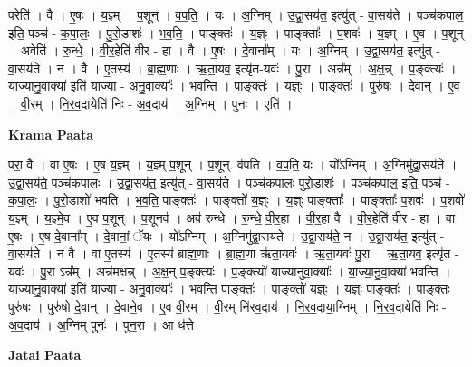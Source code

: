\documentclass[17pt]{extarticle}
\begin{document}
परेति॑ । वै । ए॒षः । य॒ज्ञ्म् । प॒शून् । व॒प॒ति॒ । यः । अ॒ग्निम् । उ॒द्वा॒सय॑त॒ इत्यु॑त् - वा॒सय॑ते । पञ्च॑कपाल॒ इति॒ पञ्च॑ - क॒पा॒लः॒ । पु॒रो॒डाशः॑ । भ॒व॒ति॒ । पाङ्क्तः॑ । य॒ज्ञ्ः । पाङ्क्ताः᳚ । प॒शवः॑ । य॒ज्ञ्म् । ए॒व । प॒शून् । अवेति॑ । रु॒न्धे॒ । वी॒र॒हेति॑ वीर - हा । वै । ए॒षः । दे॒वाना᳚म् । यः । अ॒ग्निम् । उ॒द्वा॒सय॑त॒ इत्यु॑त् - वा॒सय॑ते । न । वै । ए॒तस्य॑ । ब्रा॒ह्म॒णाः । ऋ॒ता॒यव॒ इत्यृ॑त-यवः॑ । पु॒रा । अन्न᳚म् । अ॒क्ष॒न्न् । प॒ङ्क्त्यः॑ । या॒ज्या॒नु॒वा॒क्या॑ इति॑ याज्या - अ॒नु॒वा॒क्याः᳚ । भ॒व॒न्ति॒ । पाङ्क्तः॑ । य॒ज्ञ्ः । पाङ्क्तः॑ । पुरु॑षः । दे॒वान् । ए॒व । वी॒रम् । नि॒र॒व॒दायेति॑ निः - अ॒व॒दाय॑ । अ॒ग्निम् । पुनः॑ । एति॑ ।  \newline


\textbf{Krama Paata} \newline

परा॒ वै । वा ए॒षः । ए॒ष य॒ज्ञ्म् । य॒ज्ञ्म् प॒शून् । प॒शून्. व॑पति । व॒प॒ति॒ यः । यो᳚ऽग्निम् । अ॒ग्निमु॑द्वा॒सय॑ते । उ॒द्वा॒सय॑ते॒ पञ्च॑कपालः । उ॒द्वा॒सय॑त॒ इत्यु॑त् - वा॒सय॑ते । पञ्च॑कपालः पुरो॒डाशः॑ । पञ्च॑कपाल॒ इति॒ पञ्च॑ - क॒पा॒लः॒ । पु॒रो॒डाशो॑ भवति । भ॒व॒ति॒ पाङ्क्तः॑ । पाङ्क्तो॑ य॒ज्ञ्ः । य॒ज्ञ्ः पाङ्क्ताः᳚ । पाङ्क्ताः᳚ प॒शवः॑ । प॒शवो॑ य॒ज्ञ्म् । य॒ज्ञ्मे॒व । ए॒व प॒शून् । प॒शूनव॑ । अव॑ रुन्धे । रु॒न्धे॒ वी॒र॒हा । वी॒र॒हा वै । वी॒र॒हेति॑ वीर - हा । वा ए॒षः । ए॒ष दे॒वाना᳚म् । दे॒वानां॒ ॅयः । यो᳚ऽग्निम् । अ॒ग्निमु॑द्वा॒सय॑ते । उ॒द्वा॒सय॑ते॒ न । उ॒द्वा॒सय॑त॒ इत्यु॑त् - वा॒सय॑ते । न वै । वा ए॒तस्य॑ । ए॒तस्य॑ ब्राह्म॒णाः । ब्रा॒ह्म॒णा ऋ॑ता॒यवः॑ । ऋ॒ता॒यवः॑ पु॒रा । ऋ॒ता॒यव॒ इत्यृ॑त - यवः॑ । पु॒रा ऽन्न᳚म् । अन्न॑मक्षन्न् । अ॒क्ष॒न् प॒ङ्क्त्यः॑ । प॒ङ्क्त्यो॑ याज्यानुवा॒क्याः᳚ । या॒ज्या॒नु॒वा॒क्या॑ भवन्ति । या॒ज्या॒नु॒वा॒क्या॑ इति॑ याज्या - अ॒नु॒वा॒क्याः᳚ । भ॒व॒न्ति॒ पाङ्क्तः॑ । पाङ्क्तो॑ य॒ज्ञ्ः । य॒ज्ञ्ः पाङ्क्तः॑ । पाङ्क्तः॒ पुरु॑षः । पुरु॑षो दे॒वान् । दे॒वाने॒व । ए॒व वी॒रम् । वी॒रम् नि॑रव॒दाय॑ । नि॒र॒व॒दाया॒ग्निम् । नि॒र॒व॒दायेति॑ निः - अ॒व॒दाय॑ । अ॒ग्निम् पुनः॑ । पुन॒रा । आ ध॑त्ते \newline

\textbf{Jatai Paata} \newline
\end{document}
